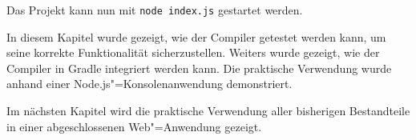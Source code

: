 \pagebreak


Das Projekt kann nun mit \lstinline{node index.js} gestartet werden.

\vspace{4em}
In diesem Kapitel wurde gezeigt, wie der Compiler getestet werden kann, um seine korrekte Funktionalität sicherzustellen. Weiters wurde gezeigt, wie der Compiler in Gradle integriert werden kann. Die praktische Verwendung wurde anhand einer Node.js"=Konsolenanwendung demonstriert.

Im nächsten Kapitel wird die praktische Verwendung aller bisherigen Bestandteile in einer abgeschlossenen Web"=Anwendung gezeigt.
